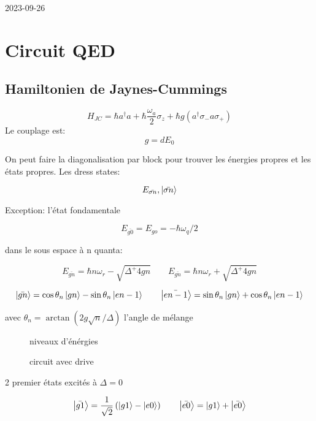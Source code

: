 


2023-09-26

\setcounter{section}{4}
\setcounter{subsection}{1}



\section*{Circuit QED}

\subsection{Hamiltonien de Jaynes-Cummings}

\[ H_{JC} = \hbar a ^{\dagger} a + \hbar \frac{\omega_a}{2} \sigma_z + \hbar g \left( a ^{\dagger} \sigma_- a \sigma_+  \right)  \]
Le couplage est:
\[ g = dE_0  \]

On peut faire la diagonalisation par block pour trouver les énergies propres et les états propres. Les dress states:

\[ E_{\bar{\sigma n}}, \ket{\bar{\sigma n}}  \]


Exception: l'état fondamentale

\[ E_{\bar{g0}} = E_{go} = -\hbar \omega_{q}/2\]


dans le sous espace à n quanta:

\[ E_{\bar{gn}} = \hbar n\omega_r - \sqrt{\Delta^ + 4g n} \qquad E_{\bar{gn}} = \hbar n\omega_r + \sqrt{\Delta^ + 4g n}  \]


\[ \ket{\bar{gn}} = \cos\theta_n \ket{gn} -\sin\theta_n \ket{en-1 } \qquad \ket{\bar{en-1}} = \sin\theta_n \ket{gn} +\cos\theta_n \ket{en-1 }\]

avec $\theta_n = \arctan(2 g \sqrt{n}/ \Delta)$ l'angle de mélange


\begin{figure}[ht]
    \centering
    \caption{niveaux d'énérgies}
    \label{fig:niveaux-denergies}
\end{figure}

\begin{figure}[ht]
    \centering
    \caption{circuit avec drive}
    \label{fig:circuit-avec-drive}
\end{figure}

2 premier états excités à $\Delta=0$

\[ \ket{\bar{g1}} = \frac{1}{\sqrt{2}} \left( \ket{g1} - \ket{e0}  \right) \qquad  \ket{\bar{e0}} = \ket{g1} + \ket{\bar{e0}}  \]

